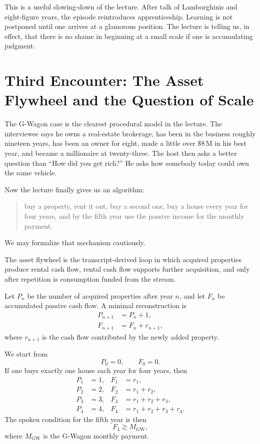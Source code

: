 This is a useful slowing-down of the lecture. After talk of Lamborghinis and eight-figure years, the episode reintroduces apprenticeship. Learning is not postponed until one arrives at a glamorous position. The lecture is telling us, in effect, that there is no shame in beginning at a small scale if one is accumulating judgment.

\section{Third Encounter: The Asset Flywheel and the Question of Scale}

The G-Wagon case is the clearest procedural model in the lecture. The interviewee says he owns a real-estate brokerage, has been in the business roughly nineteen years, has been an owner for eight, made a little over \(\$8\,\mathrm{M}\) in his best year, and became a millionaire at twenty-three. The host then asks a better question than ``How did you get rich?'' He asks how somebody today could own the same vehicle.

Now the lecture finally gives us an algorithm:
\begin{quote}
buy a property, rent it out, buy a second one, buy a house every year for four years, and by the fifth year use the passive income for the monthly payment.
\end{quote}

We may formalize that mechanism cautiously.

\begin{definition}
The asset flywheel is the transcript-derived loop in which acquired properties produce rental cash flow, rental cash flow supports further acquisition, and only after repetition is consumption funded from the stream.
\end{definition}

Let \(P_n\) be the number of acquired properties after year \(n\), and let \(F_n\) be accumulated passive cash flow. A minimal reconstruction is
\begin{align}
P_{n+1} &= P_n + 1,\\
F_{n+1} &= F_n + r_{n+1},
\end{align}
where \(r_{n+1}\) is the cash flow contributed by the newly added property.

We start from
\[
P_0=0,\qquad F_0=0.
\]
If one buys exactly one house each year for four years, then
\begin{align}
P_1&=1, & F_1&=r_1,\\
P_2&=2, & F_2&=r_1+r_2,\\
P_3&=3, & F_3&=r_1+r_2+r_3,\\
P_4&=4, & F_4&=r_1+r_2+r_3+r_4.
\end{align}
The spoken condition for the fifth year is then
\begin{equation}
F_4 \gtrsim M_{\mathrm{GW}},
\end{equation}
where \(M_{\mathrm{GW}}\) is the G-Wagon monthly payment.

